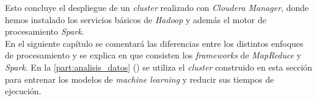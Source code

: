 Esto concluye el despliegue de un \textit{cluster} realizado con \textit{Cloudera Manager}, donde hemos instalado los
servicios básicos de \textit{Hadoop} y además el motor de procesamiento \textit{Spark}.\\
En el siguiente capítulo se comentará las diferencias entre los distintos enfoques de procesamiento y se
explica en que consisten los \textit{frameworks} de \textit{MapReduce} y \textit{Spark}.
En la \autoref{part:analisis_datos} () se utiliza el \textit{cluster} construido 
en esta sección para entrenar los modelos de \textit{machine learning} y reducir sus tiempos de ejecución.

\clearpage
